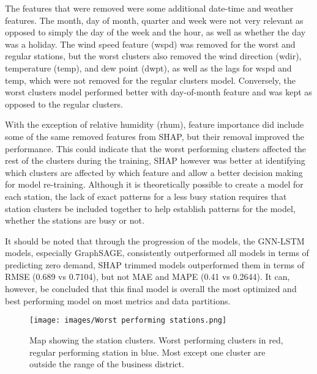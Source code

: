 \documentclass{article}
\begin{document}
The features that were removed were some additional date-time and weather features. The month, day of month, quarter and week were not very relevant as opposed to simply the day of the week and the hour, as well as whether the day was a holiday. The wind speed feature (wspd) was removed for the worst and regular stations, but the worst clusters also removed the wind direction (wdir), temperature (temp), and dew point (dwpt), as well as the lags for wspd and temp, which were not removed for the regular clusters model. Conversely, the worst clusters model performed better with day-of-month feature and was kept as opposed to the regular clusters.

With the exception of relative humidity (rhum), feature importance did include some of the same removed features from SHAP, but their removal improved the performance. This could indicate that the worst performing clusters affected the rest of the clusters during the training, SHAP however was better at identifying which clusters are affected by which feature and allow a better decision making for model re-training. Although it is theoretically possible to create a model for each station, the lack of exact patterns for a less busy station requires that station clusters be included together to help establish patterns for the model, whether the stations are busy or not.

It should be noted that through the progression of the models, the GNN-LSTM models, especially GraphSAGE, consistently outperformed all models in terms of predicting zero demand, SHAP trimmed models outperformed them in terms of RMSE (0.689 vs 0.7104), but not MAE and MAPE (0.41 vs 0.2644). It can, however, be concluded that this final model is overall the most optimized and best performing model on most metrics and data partitions.

\begin{figure}
\centering
\texttt{[image: images/Worst performing stations.png]}
\caption{Map showing the station clusters. Worst performing clusters in red, regular performing station in blue. Most except one cluster are outside the range of the business district.}
\label{fig:worst_clusters}
\end{figure}
\end{document}
